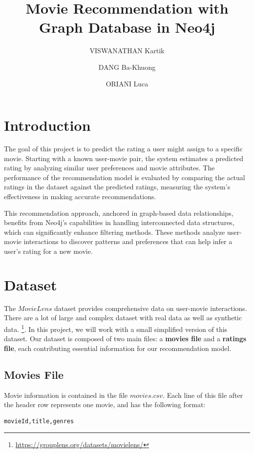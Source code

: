 \documentclass{article}
\title{Movie Recommendation with Graph Database in Neo4j}
\author{VISWANATHAN Kartik \and DANG Ba-Khuong \and ORIANI Luca}
\begin{document}
\maketitle


\section{Introduction}

The goal of this project is to predict the rating a user might assign to a specific movie. Starting with a known user-movie pair, the system estimates a predicted rating by analyzing similar user preferences and movie attributes. The performance of the recommendation model is evaluated by comparing the actual ratings in the dataset against the predicted ratings, measuring the system's effectiveness in making accurate recommendations.

This recommendation approach, anchored in graph-based data relationships, benefits from Neo4j's capabilities in handling interconnected data structures, which can significantly enhance filtering methods. These methods analyze user-movie interactions to discover patterns and preferences that can help infer a user’s rating for a new movie.

\section{Dataset}

The $MovieLens$ dataset provides comprehensive data on user-movie interactions. There are a lot of large and complex dataset with real data as well as synthetic data. \footnote{\href{https://grouplens.org/datasets/movielens/}{https://grouplens.org/datasets/movielens/}}. In this project, we will work with a small simplified version of this dataset. Our dataset is composed of two main files: a \textbf{movies file} and a \textbf{ratings file}, each contributing essential information for our recommendation model.

\subsection{Movies File}
Movie information is contained in the file $movies.csv$. Each line of this file after the header row represents one movie, and has the following format:

\begin{verbatim}
movieId,title,genres
\end{verbatim}
\end{document}
